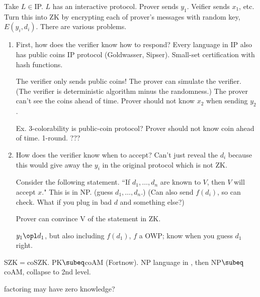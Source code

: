 Take $L\in $IP. $L$ has an interactive protocol. Prover sends $y_1$. Veifier sends $x_1$, etc. Turn this into ZK by encrypting each of prover's messages with random key, $E(y_i, d_i)$. There are various problems. 
\begin{enumerate}
\item
First, how does the verifier know how to respond?
Every language in IP also has public coins IP protocol (Goldwasser, Sipser). Small-set certification with hash functions. 

The verifier only sends public coins! The prover can simulate the verifier. (The verifier is deterministic algorithm minus the randomness.) The prover can't see the coins ahead of time. 
Prover should not know $x_2$ when sending $y_2$.

Ex. 3-colorability is public-coin protocol? Prover should not know coin ahead of time.
1-round. ???

\item
How does the verifier know when to accept? Can't just reveal the $d_i$ because this would give away the $y_i$ in the original protocol which is not ZK. 

Consider the following statement. ``If $d_1,\ldots, d_n$ are known to $V$, then $V$ will accept $x$." This is in NP. (guess $d_1,\ldots, d_n$.) %
(Can also send $f(d_i)$, so can check. What if you plug in bad $d$ and something else?)

Prover can convince V of the statement in ZK.

$y_1\opl d_1$, but also including $f(d_1)$, $f$ a OWP; know when you guess $d_1$ right. 


\end{enumerate}
SZK$=$coSZK. PK$\subeq$coAM (Fortnow). NP language in , then NP$\subeq$coAM, collapse to 2nd level.


factoring may have zero knowledge?

%
%
